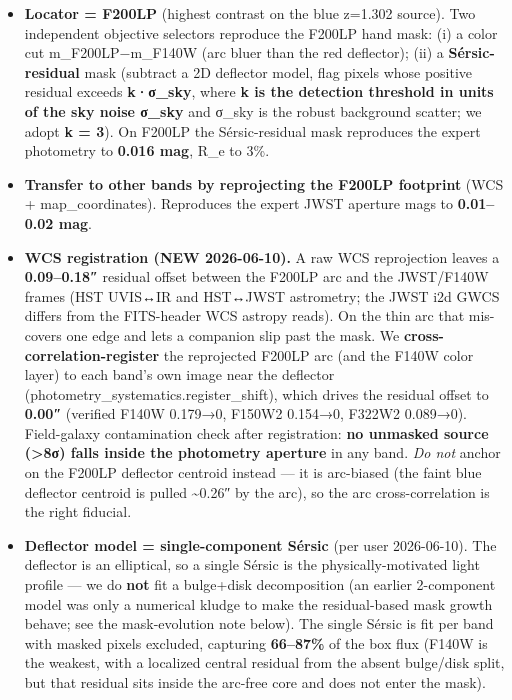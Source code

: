 \documentclass[
]{article}
\newcommand{\BreakablePath}[1]{{\ttfamily\sloppy #1}}
\begin{document}
\begin{itemize}
\item
  \textbf{Locator = F200LP} (highest contrast on the blue z=1.302
  source). Two independent objective selectors reproduce the F200LP hand
  mask: (i) a color cut m\_F200LP−m\_F140W (arc bluer than the red
  deflector); (ii) a \textbf{Sérsic-residual} mask (subtract a 2D
  deflector model, flag pixels whose positive residual exceeds
  \textbf{k·σ\_sky}, where \textbf{k is the detection threshold in units
  of the sky noise σ\_sky} and σ\_sky is the robust background scatter;
  we adopt \textbf{k = 3}). On F200LP the Sérsic-residual mask
  reproduces the expert photometry to \textbf{0.016 mag}, R\_e to 3\%.
\item
  \textbf{Transfer to other bands by reprojecting the F200LP footprint}
  (WCS + \BreakablePath{map\_\discretionary{}{}{}coordinates}).
  Reproduces the expert JWST aperture mags to \textbf{0.01--0.02 mag}.
\item
  \textbf{WCS registration (NEW 2026-06-10).} A raw WCS reprojection
  leaves a \textbf{0.09--0.18″} residual offset between the F200LP arc
  and the JWST/F140W frames (HST UVIS↔IR and HST↔JWST astrometry; the
  JWST i2d GWCS differs from the FITS-header WCS astropy reads). On the
  thin arc that mis-covers one edge and lets a companion slip past the
  mask. We \textbf{cross-correlation-register} the reprojected F200LP
  arc (and the F140W color layer) to each band's own image near the
  deflector
  (\BreakablePath{photometry\_\discretionary{}{}{}systematics.\discretionary{}{}{}register\_\discretionary{}{}{}shift}),
  which drives the residual offset to \textbf{0.00″} (verified F140W
  0.179→0, F150W2 0.154→0, F322W2 0.089→0). Field-galaxy contamination
  check after registration: \textbf{no unmasked source (\textgreater8σ)
  falls inside the photometry aperture} in any band. \emph{Do not}
  anchor on the F200LP deflector centroid instead --- it is arc-biased
  (the faint blue deflector centroid is pulled \textasciitilde0.26″ by
  the arc), so the arc cross-correlation is the right fiducial.
\item
  \textbf{Deflector model = single-component Sérsic} (per user
  2026-06-10). The deflector is an elliptical, so a single Sérsic is the
  physically-motivated light profile --- we do \textbf{not} fit a
  bulge+disk decomposition (an earlier 2-component model was only a
  numerical kludge to make the residual-based mask growth behave; see
  the mask-evolution note below). The single Sérsic is fit per band with
  masked pixels excluded, capturing \textbf{66--87\%} of the box flux
  (F140W is the weakest, with a localized central residual from the
  absent bulge/disk split, but that residual sits inside the arc-free
  core and does not enter the mask).


\end{itemize}
\end{document}
